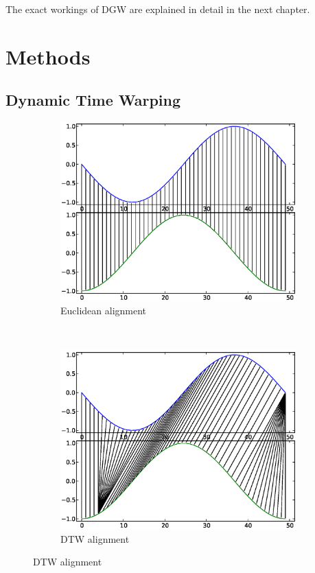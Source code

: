 \documentclass[parskip]{cs4rep}
\begin{document}

The exact workings of DGW are explained in detail in the next chapter.

\chapter{Methods}
\section{Dynamic Time Warping}
\label{sec:DTW}

\begin{figure}[b,t]
   \centering
   \begin{subfigure}[b]{0.45\textwidth}
       \centering
       \includegraphics[width=\textwidth]{figures/DTW/sin-cos-no-dtw.eps}
       \caption{Euclidean alignment}
       \label{fig:DTW:euclidean_alignment}
   \end{subfigure}
   ~
   \begin{subfigure}[b]{0.45\textwidth}
       \centering
       \includegraphics[width=\textwidth]{figures/DTW/sin-cos-dtw.eps}
       \caption{DTW alignment}
       \label{fig:DTW:dtw_alignment}
   \end{subfigure}
   

\end{figure}
\end{document}
